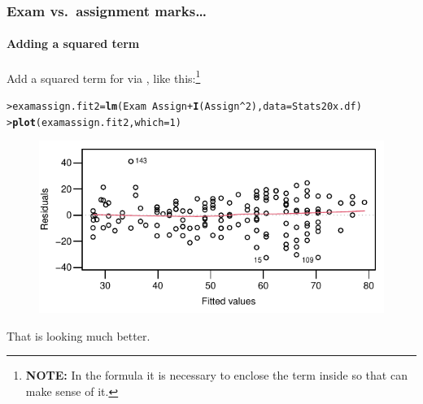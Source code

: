 \documentclass{beamer}\usepackage[]{graphicx}\usepackage[]{xcolor}
\makeatletter
\newcommand{\hlnum}[1]{\textcolor[rgb]{0.686,0.059,0.569}{#1}}%
\newcommand{\hlopt}[1]{\textcolor[rgb]{0,0,0}{#1}}%
\newcommand{\hlstd}[1]{\textcolor[rgb]{0.345,0.345,0.345}{#1}}%
\newcommand{\hlkwb}[1]{\textcolor[rgb]{0.69,0.353,0.396}{#1}}%
\newcommand{\hlkwc}[1]{\textcolor[rgb]{0.333,0.667,0.333}{#1}}%
\newcommand{\hlkwd}[1]{\textcolor[rgb]{0.737,0.353,0.396}{\textbf{#1}}}%
\newenvironment{kframe}{%
 \def\at@end@of@kframe{}%
 \ifinner\ifhmode%
  \def\at@end@of@kframe{\end{minipage}}%
  \begin{minipage}{\columnwidth}%
 \fi\fi%
 \def\FrameCommand##1{\hskip\@totalleftmargin \hskip-\fboxsep
 \colorbox{shadecolor}{##1}\hskip-\fboxsep
     \hskip-\linewidth \hskip-\@totalleftmargin \hskip\columnwidth}%
 \MakeFramed {\advance\hsize-\width
   \@totalleftmargin\z@ \linewidth\hsize
   \@setminipage}}%
 {\par\unskip\endMakeFramed%
 \at@end@of@kframe}
\newenvironment{knitrout}{}{} %
\makeatother
\begin{document}
\begin{frame}[ fragile]
\frametitle{Exam vs.\ assignment marks\ldots}
\framesubtitle{Adding a squared term}

Add a squared term for  via , like this:\footnote{
\textbf{NOTE:} In the  formula it is necessary to enclose the  term
inside  so that  can make sense of it.}

\begin{knitrout}\scriptsize
{}\color{fgcolor}\begin{kframe}
\begin{alltt}
\hlstd{> }\hlstd{examassign.fit2}\hlkwb{=}\hlkwd{lm}\hlstd{(Exam}\hlopt{~} \hlstd{Assign} \hlopt{+} \hlkwd{I}\hlstd{(Assign}\hlopt{^}\hlnum{2}\hlstd{),} \hlkwc{data} \hlstd{= Stats20x.df)}
\hlstd{> }\hlkwd{plot}\hlstd{(examassign.fit2,}\hlkwc{which}\hlstd{=}\hlnum{1}\hlstd{)}
\end{alltt}
\end{kframe}
\end{knitrout}


\vspace{-3mm}

\begin{figure}
  \centering
  \includegraphics{figure/RC-H04-012}
\end{figure}

\vspace{-3mm}
That is looking much better.
\end{frame}
\end{document}
